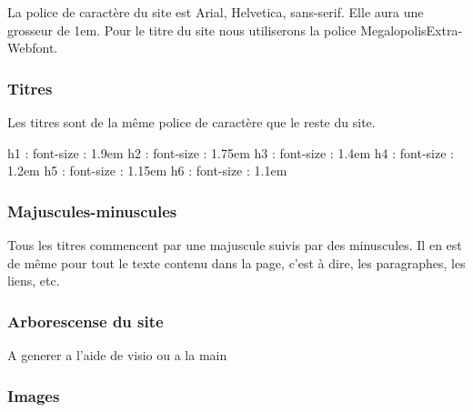 \documentclass[letter, 10pt]{report}
\begin{document}
La police de caractère du site est Arial, Helvetica, sans-serif. Elle aura une grosseur de 1em. Pour le titre du site nous utiliserons la police MegalopolisExtra-Webfont.

\subsubsection{Titres}

Les titres sont de la même police de caractère que le reste du site.

h1 : font-size : 1.9em
h2 : font-size : 1.75em
h3 : font-size : 1.4em
h4 : font-size : 1.2em
h5 : font-size : 1.15em
h6 : font-size : 1.1em

\subsubsection{Majuscules-minuscules}

Tous les titres commencent par une majuscule suivis par des minuscules. Il en est de même pour tout le texte contenu dans la page, c'est à dire, les paragraphes, les liens, etc.

\subsubsection{Arborescense du site}

A generer a l'aide de visio ou a la main

\subsubsection{Images}
\end{document}
